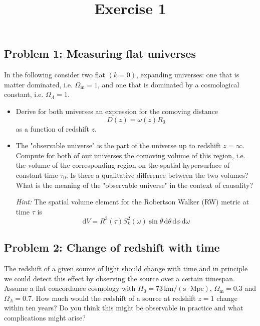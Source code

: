 \documentclass[a4paper]{article}
\begin{document}
\title{\textbf{Exercise 1}}
\author{}
\date{}

\maketitle

\subsection*{Problem 1: Measuring flat universes}

In the following consider two flat $(k=0)$, expanding universes: one that is matter dominated, i.e. $\Omega_\mathrm{m}=1$, and one that is dominated by a cosmological constant, i.e. $\Omega_\Lambda=1$.

\begin{itemize}
    \item[(a)] Derive for both universes an expression for the comoving distance
    \[
    D(z) = \omega(z)R_0
    \]
    as a function of redshift $z$.

    \item[(b)] The "observable universe" is the part of the universe up to redshift $z=\infty$. Compute for both of our universes the comoving volume of this region, i.e. the volume of the corresponding region on the spatial hypersurface of constant time $\tau_0$. Is there a qualitative difference between the two volumes? What is the meaning of the "observable universe" in the context of causality?
    
    \textit{Hint:} The spatial volume element for the Robertson Walker (RW) metric at time $\tau$ is
    \[
    \mathrm{d}V = R^3(\tau)S_k^2(\omega)\sin\theta\,\mathrm{d}\theta\,\mathrm{d}\phi\,\mathrm{d}\omega
    \]
\end{itemize}

\subsection*{Problem 2: Change of redshift with time}

The redshift of a given source of light should change with time and in principle we could detect this effect by observing the source over a certain timespan. Assume a flat concordance cosmology with $H_0=73\,\mathrm{km/(s\cdot Mpc)}$, $\Omega_\mathrm{m}=0.3$ and $\Omega_\Lambda=0.7$. How much would the redshift of a source at redshift $z=1$ change within ten years? Do you think this might be observable in practice and what complications might arise?
\end{document}
